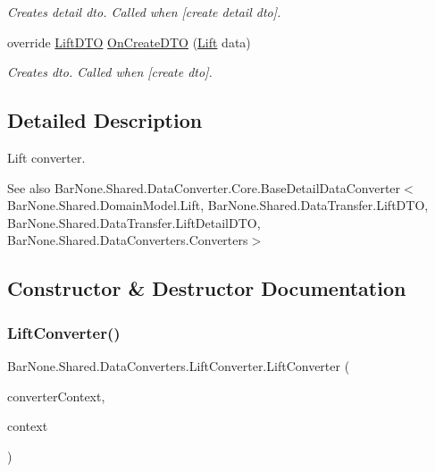 \begin{DoxyCompactItemize}
\begin{DoxyCompactList}\small\item\em Creates detail dto. Called when \mbox{[}create detail dto\mbox{]}. \end{DoxyCompactList}\item 
override \mbox{\hyperlink{class_bar_none_1_1_shared_1_1_data_transfer_1_1_lift_d_t_o}{Lift\+D\+TO}} \mbox{\hyperlink{class_bar_none_1_1_shared_1_1_data_converters_1_1_lift_converter_af2be6fc4e5f606c4e3bf88c8f6bfed94}{On\+Create\+D\+TO}} (\mbox{\hyperlink{class_bar_none_1_1_shared_1_1_domain_model_1_1_lift}{Lift}} data)
\begin{DoxyCompactList}\small\item\em Creates dto. Called when \mbox{[}create dto\mbox{]}. \end{DoxyCompactList}\end{DoxyCompactItemize}


\subsection{Detailed Description}
Lift converter. 

\begin{DoxySeeAlso}{See also}
Bar\+None.\+Shared.\+Data\+Converter.\+Core.\+Base\+Detail\+Data\+Converter$<$\+Bar\+None.\+Shared.\+Domain\+Model.\+Lift, Bar\+None.\+Shared.\+Data\+Transfer.\+Lift\+D\+T\+O, Bar\+None.\+Shared.\+Data\+Transfer.\+Lift\+Detail\+D\+T\+O, Bar\+None.\+Shared.\+Data\+Converters.\+Converters$>$


\end{DoxySeeAlso}


\subsection{Constructor \& Destructor Documentation}
\mbox{\label{class_bar_none_1_1_shared_1_1_data_converters_1_1_lift_converter_a402f71549f932cff973a1411b3bddbb6}} 
\subsubsection{\texorpdfstring{Lift\+Converter()}{LiftConverter()}}
{\footnotesize\ttfamily Bar\+None.\+Shared.\+Data\+Converters.\+Lift\+Converter.\+Lift\+Converter (\begin{DoxyParamCaption}\item[{\mbox{\hyperlink{class_bar_none_1_1_shared_1_1_data_converters_1_1_converters}{Converters}}}]{converter\+Context,  }\item[{\mbox{\hyperlink{interface_bar_none_1_1_shared_1_1_core_1_1_i_domain_context}{I\+Domain\+Context}}}]{context }\end{DoxyParamCaption})}



